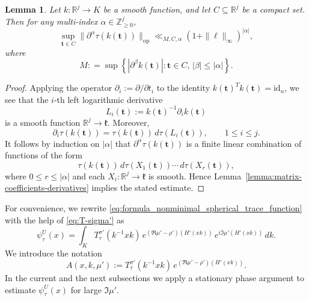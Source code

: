 \documentclass[11pt,oneside]{amsart}
\numberwithin{equation}{section}
\theoremstyle{remark}
\theoremstyle{plain}
\newtheorem{lemma}{Lemma}
\newcommand\id{\mathrm{id}}
\newcommand\ZZ{\mathbb{Z}}
\newcommand\RR{\mathbb{R}}
\newcommand{\bt}{\mathbf{t}}
\renewcommand\leq{\leqslant}
\renewcommand\geq{\geqslant}
\begin{document}
\begin{lemma}\label{lemma:matrix-coefficients-derivatives-2} 
Let $k:\RR^j\to K$ be a smooth function, and let $C\subseteq\RR^j$ be a compact set. Then for any multi-index $\alpha\in\ZZ_{\geq 0}^j$,
\[
\sup_{\bt\in C} \| \partial^\alpha\tau(k(\bt)) \|_{\mathrm{op}} \ll_{M,C,\alpha} (1+\|\bm\ell\|_{\infty})^{|\alpha|},
\]
where
\[
M: = \sup \left\{|\partial^{\beta}k(\bt)|:\bt\in C,\,|\beta|\leq|\alpha|\right\}.
\]
\end{lemma}
\begin{proof} Applying the operator $\partial_i:=\partial/\partial t_i$ to the identity $k(\bt)^T k(\bt)=\id_n$, we see that the $i$-th left logarithmic derivative
\[L_i(\bt):=k(\bt)^{-1}\partial_i k(\bt)\]
is a smooth function $\RR^j\to\mathfrak{k}$. Moreover,
\[\partial_i\tau(k(\bt))=\tau(k(\bt))\,d\tau(L_i(\bt)),\qquad 1\leq i\leq j.\]
It follows by induction on $|\alpha|$ that $\partial^\alpha\tau(k(\bt))$ is a finite linear combination of functions of the form
\[\tau(k(\bt))\,d\tau(X_1(\bt))\dotsb\,d\tau(X_r(\bt)),\]
where $0\leq r\leq|\alpha|$ and each $X_i:\RR^j\to\mathfrak{k}$ is smooth. Hence Lemma~\ref{lemma:matrix-coefficients-derivatives} implies the stated estimate.
\end{proof}
For convenience, we rewrite \eqref{eq:formula_nonminimal_spherical_trace_function} with the help of \eqref{eq:T-sigma'} as
\begin{equation}\label{eq:formula_nonminimal_spherical_trace_function-rewritten}
\psi_\tau^{U}(x)
=\int_K T_\tau^{\sigma'}(k^{-1}xk)\,e^{(\Re\mu'-\rho')(H'(xk))}\,e^{i\Im\mu'(H'(xk))}\,dk.
\end{equation}
We introduce the notation
\begin{equation}\label{eq:A(x,k,mu')}
A(x,k,\mu'):= T_\tau^{\sigma'}(k^{-1}xk)\,e^{(\Re\mu'-\rho')(H'(xk))}.
\end{equation}
In the current and the next subsections we apply a stationary phase argument to estimate $\psi_\tau^{U}(x)$ for large $\Im\mu'$.
\end{document}
